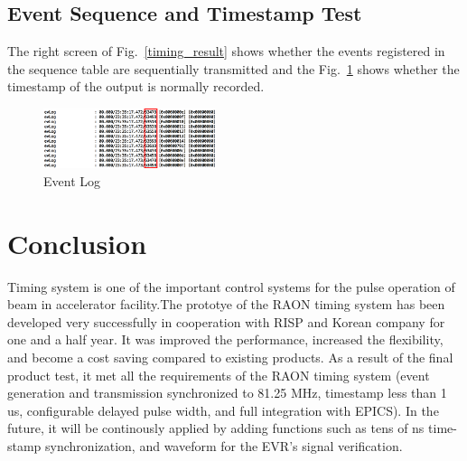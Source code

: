 \documentclass[journal,reqno]{IEEEtran}
\begin{document}
\subsection{Event Sequence and Timestamp Test}
The right screen of Fig.~\ref{timing_result} shows whether the events registered in the sequence table are sequentially transmitted and the Fig.~\ref*{event_log} shows whether the timestamp of the output is normally recorded.

\begin{figure}[!htb]
	\centering
	\includegraphics*[width=0.45\textwidth, height=0.13\textwidth]{img23.png}
	\caption{Event Log}
	\label{event_log}
\end{figure}

\section{Conclusion}
Timing system is one of the important control systems for the pulse operation of beam in accelerator facility.The prototye of the RAON timing system has been developed very successfully in cooperation with RISP and Korean company for one and a half year. It was improved the performance, increased the flexibility, and become a cost saving compared to existing products. As a result of the final product test, it met all the requirements of the RAON timing system (event generation and transmission synchronized to 81.25 MHz, timestamp less than 1 us,  configurable delayed pulse width, and full integration with EPICS). In the future, it will be continously applied by adding functions such as tens of ns time-stamp synchronization, and waveform for the EVR's signal verification.
\end{document}
